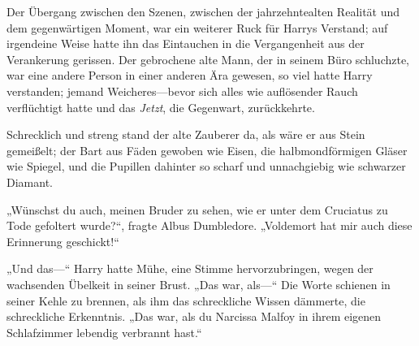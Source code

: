 %
Der Übergang zwischen den Szenen, zwischen der jahrzehntealten Realität und dem gegenwärtigen Moment, war ein weiterer Ruck für Harrys Verstand; auf irgendeine Weise hatte ihn das Eintauchen in die Vergangenheit aus der Verankerung gerissen. Der gebrochene alte Mann, der in seinem Büro schluchzte, war eine andere Person in einer anderen Ära gewesen, so viel hatte Harry verstanden; jemand Weicheres—bevor sich alles wie auflösender Rauch verflüchtigt hatte und das \emph{Jetzt}, die Gegenwart, zurückkehrte.

Schrecklich und streng stand der alte Zauberer da, als wäre er aus Stein gemeißelt; der Bart aus Fäden gewoben wie Eisen, die halbmondförmigen Gläser wie Spiegel, und die Pupillen dahinter so scharf und unnachgiebig wie schwarzer Diamant.

„Wünschst du auch, meinen Bruder zu sehen, wie er unter dem Cruciatus zu Tode gefoltert wurde?“, fragte Albus Dumbledore. „Voldemort hat mir auch diese Erinnerung geschickt!“

„Und das—“ Harry hatte Mühe, eine Stimme hervorzubringen, wegen der wachsenden Übelkeit in seiner Brust. „Das war, als—“
Die Worte schienen in seiner Kehle zu brennen, als ihm das schreckliche Wissen dämmerte, die schreckliche Erkenntnis.
„Das war, als du Narcissa Malfoy in ihrem eigenen Schlafzimmer lebendig verbrannt hast.“

